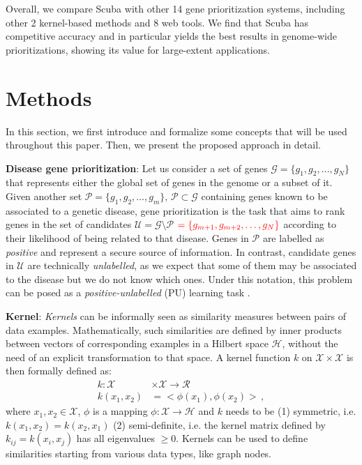 \documentclass[twocolumn]{bmcart}%
\begin{document}
Overall, we compare Scuba with other 14 gene prioritization systems, including other 2 kernel-based methods and 8 web tools. We find that Scuba has competitive accuracy and in particular yields the best results in genome-wide prioritizations, showing its value for large-extent applications.



\section*{Methods}
In this section, we first introduce and formalize some concepts that will be used throughout this paper. Then, we present the proposed approach in detail.

\textbf{Disease gene prioritization}: Let us consider a set of genes $\mathcal{G} = \lbrace g_1, g_2, \ldots, g_N \rbrace$ that represents either the global set of genes in the genome or a subset of it. Given another set $\mathcal{P} = \lbrace g_1, g_2, \ldots, g_m \rbrace, \, \mathcal{P} \subset \mathcal{G}$ containing genes known to be associated to a genetic disease, gene prioritization is the task that aims to rank genes in the set of candidates $\mathcal{U} = \mathcal{G} \setminus \mathcal{P}$ $\textcolor{red}{= \lbrace g_{m+1}, g_{m+2}, \ldots, g_N \rbrace}$ according to their likelihood of being related to that disease. Genes in $\mathcal{P}$ are labelled as \emph{positive} and represent a secure source of information. In contrast, candidate genes in $\mathcal{U}$ are technically \emph{unlabelled}, as we expect that some of them may be associated to the disease but we do not know which ones. Under this notation, this problem can be posed as a \emph{positive-unlabelled} (PU) learning task \cite{prodige,chapelle}.

\textbf{Kernel}: \textit{Kernels} can be informally seen as similarity measures between pairs of data examples. Mathematically, such similarities are defined by inner products between vectors of corresponding examples in a Hilbert space $\mathcal{H}$, without the need of an explicit transformation to that space. A kernel function $k$ on $\mathcal{X} \times \mathcal{X} $ is then formally defined as:
\begin{align*}
	k: \mathcal{X} &\times \mathcal{X} \longrightarrow \mathcal{R}\\
	k(x_{1}, x_{2}) &= \mathcal{<}\phi(x_{1}),\phi(x_{2})\mathcal{>} \, ,
\end{align*}
where $x_1, x_2 \in \mathcal{X}$, $\phi$ is a mapping $\phi:\mathcal{X} \longrightarrow \mathcal{H}$ and $k$ needs to be (1) symmetric, i.e. $k(x_1,x_2)=k(x_2,x_1)$ (2) semi-definite, i.e. the kernel matrix defined by $k_{ij} = k(x_i, x_j)$ has all eigenvalues $\geq 0$. Kernels can be used to define similarities starting from various data types, like graph nodes.
\end{document}
